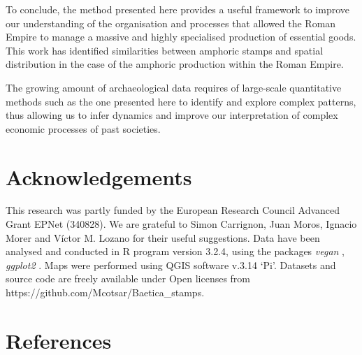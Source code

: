 \documentclass[review]{elsarticle}
\begin{document}
To conclude, the method presented here provides a useful framework to improve our understanding of the organisation and processes that allowed the Roman Empire to manage a massive and highly specialised production of essential goods. This work has identified similarities between amphoric stamps and spatial distribution in the case of the amphoric production within the Roman Empire.

The growing amount of archaeological data requires of large-scale quantitative methods such as the one presented here to identify and explore complex patterns, thus allowing us to infer dynamics and improve our interpretation of complex economic processes of past societies. 

\section{Acknowledgements}

This research was partly funded by the European Research Council Advanced Grant EPNet (340828). We are grateful to Simon Carrignon, Juan Moros, Ignacio Morer and Víctor M. Lozano for their useful suggestions.  
Data have been analysed and conducted in R program version 3.2.4, using the packages \textit{vegan} \citep{oksanen_vegan_2007}, \textit{ggplot2} \citep{ggplot2:_2016}. Maps were performed using QGIS software v.3.14 `Pi'. Datasets and source code are freely available under Open licenses from https://github.com/Mcotsar/Baetica\_stamps.


\section{References}

%

\end{document}

